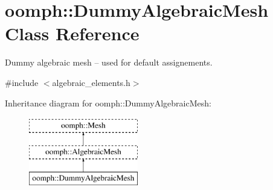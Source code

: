 \hypertarget{classoomph_1_1DummyAlgebraicMesh}{}\section{oomph\+:\+:Dummy\+Algebraic\+Mesh Class Reference}
\label{classoomph_1_1DummyAlgebraicMesh}


Dummy algebraic mesh -- used for default assignements.  




{\ttfamily \#include $<$algebraic\+\_\+elements.\+h$>$}

Inheritance diagram for oomph\+:\+:Dummy\+Algebraic\+Mesh\+:\begin{figure}[H]
\begin{center}
\leavevmode
\includegraphics[height=3.000000cm]{classoomph_1_1DummyAlgebraicMesh}
\end{center}
\end{figure}
